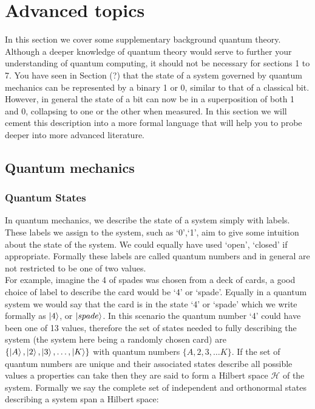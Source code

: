 \chapter{Advanced topics}\label{Advancedtopics}

In this section we cover some supplementary background quantum theory. Although a deeper knowledge of quantum theory would serve to further your understanding of quantum computing, it should not be necessary for sections 1 to 7. You have seen in Section (?) that the state of a system governed by quantum mechanics can be represented by a binary 1 or 0, similar to that of a classical bit. However, in general the state of a bit can now be in a superposition of both 1 and 0, collapsing to one or the other when measured. In this section we will cement this description into a more formal language that will help you to probe deeper into more advanced literature.

\section{Quantum mechanics}

\subsection{Quantum States}

In quantum mechanics, we describe the state of a system simply with labels. These labels we assign to the system, such as {`0',`1'}, aim to give some intuition about the state of the system. We could equally have used {`open', `closed'} if appropriate. Formally these labels are called quantum numbers and in general are not restricted to be one of two values.\\

For example, imagine the 4 of spades was chosen from a deck of cards, a good choice of label to describe the card would be `4' or `spade'. Equally in a quantum system we would say that the card is in the state `4' or `spade' which we write formally as $\left\vert{4}\right\rangle$, or $\left\vert{spade}\right\rangle$. In this scenario the quantum number `4' could have been one of 13 values, therefore the set of states needed to fully describing the system (the system here being a randomly chosen card) are $\{\left\vert{A}\right\rangle, \left\vert{2}\right\rangle, \left\vert{3}\right\rangle,\ldots ,\left\vert{K}\right\rangle\}$ with quantum numbers $\{A,2,3,\ldots K\}$. If the set of quantum numbers are unique and their associated states describe all possible values a properties can take then they are said to form a Hilbert space $\mathcal{H}$ of the system. Formally we say the complete set of independent and orthonormal states describing a system span a Hilbert space:

